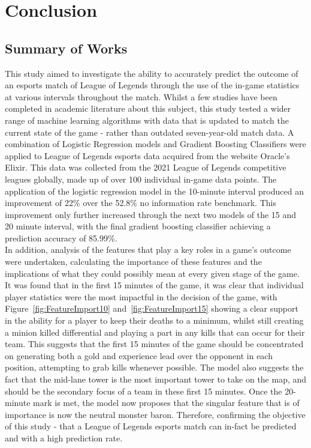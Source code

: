 \chapter{Conclusion}\label{ch:conclusion}

\section{Summary of Works}\label{sec:Summary of Works}

This study aimed to investigate the ability to accurately predict the outcome of an esports match of League of Legends through the use of the in-game statistics at various intervals throughout the match.
Whilst a few studies have been completed in academic literature about this subject, this study tested a wider range of machine learning algorithms with data that is updated to match the current state of the game - rather than outdated seven-year-old match data.
A combination of Logistic Regression models and Gradient Boosting Classifiers were applied to League of Legends esports data acquired from the website Oracle's Elixir.
This data was collected from the 2021 League of Legends competitive leagues globally, made up of over 100 individual in-game data points.
The application of the logistic regression model in the 10-minute interval produced an improvement of 22\% over the 52.8\% no information rate benchmark.
This improvement only further increased through the next two models of the 15 and 20 minute interval, with the final gradient boosting classifier achieving a prediction accuracy of 85.99\%. \\

In addition, analysis of the features that play a key roles in a game's outcome were undertaken, calculating the importance of these features and the implications of what they could possibly mean at every given stage of the game.
It was found that in the first 15 minutes of the game, it was clear that individual player  statistics were the most impactful in the decision of the game, with Figure~\ref{fig:FeatureImport10} and~\ref{fig:FeatureImport15} showing a clear support in the ability for a player to keep their deaths to a minimum, whilst still creating a minion killed differential and playing a part in any kills that can occur for their team.
This suggests that the first 15 minutes of the game should be concentrated on generating both a gold and experience lead over the opponent in each position, attempting to grab kills whenever possible.
The model also suggests the fact that the mid-lane tower is the most important tower to take on the map, and should be the secondary focus of a team in these first 15 minutes.
Once the 20-minute mark is met, the model now proposes that the singular feature that is of importance is now the neutral monster \gls{baron}.
Therefore, confirming the objective of this study - that a League of Legends esports match can in-fact be predicted and with a high prediction rate. \\

